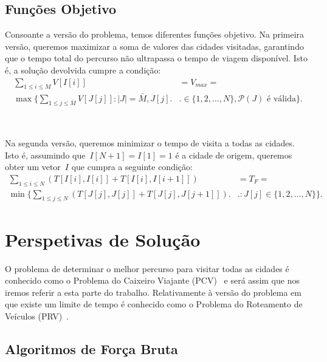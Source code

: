 \documentclass[12pt,a4paper,reqno]{report}
\numberwithin{figure}{section}
\numberwithin{equation}{section}
\numberwithin{figure}{section}
\numberwithin{equation}{section}
\begin{document}
\section{Funções Objetivo}

Consoante a versão do problema, temos diferentes funções objetivo. Na primeira versão, queremos maximizar a soma de valores das cidades visitadas, garantindo que o tempo total do percurso não ultrapassa o tempo de viagem disponível. Isto é, a solução devolvida cumpre a condição:
\begin{equation}
	\begin{split}
		\sum_{1 \leq i \leq M} V[I[i]] & = V_{max} = \\
		\max \Bigg\{\sum_{1 \leq j \leq \bar{M}} V[J[j]] : |J| = \bar{M}, J[j] \Bigg. & \Bigg. \in \{1, 2, \ldots, N\}, \mathscr{P}(J) \text{ é válida}\Bigg\}.
	\end{split}
\end{equation}

\
\

Na segunda versão, queremos minimizar o tempo de visita a todas as cidades. Isto é, assumindo que~$I[N+1] = I[1] = 1$ é a cidade de origem, queremos obter um vetor~$I$ que cumpra a seguinte condição:
\begin{equation}
	\begin{split}
		\sum_{1 \leq i \leq N} (T[I[i],I[i]] + T[I[i],I[i+1]]) & = T_F = \\
		\min \Bigg\{\sum_{1 \leq j \leq N} (T[J[j],J[j]] + T[J[j],J[j+1]]) \Bigg. & \Bigg. : J[j] \in \{1, 2, \ldots, N\}\Bigg\}.
	\end{split}
\end{equation}


\chapter{Perspetivas de Solução}

O problema de determinar o melhor percurso para visitar todas as cidades é conhecido como o Problema do Caixeiro Viajante (PCV)~\cite{wiki_tsp} e será assim que nos iremos referir a esta parte do trabalho. Relativamente à versão do problema em que existe um limite de tempo é conhecido como o Problema do Roteamento de Veículos (PRV)~\cite{wiki_vrp}.

\section{Algoritmos de Força Bruta}
\end{document}
